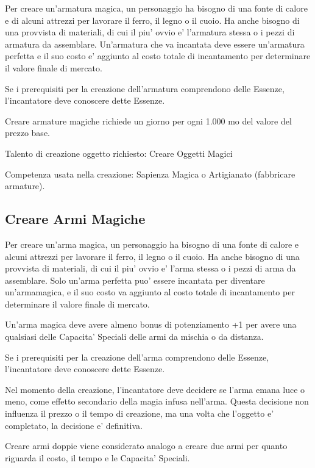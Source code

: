 \documentclass[a4paper,11pt,twoside,openany]{book}
\begin{document}
{		Per creare un'armatura magica, un personaggio ha bisogno di una fonte di calore e di alcuni attrezzi per lavorare il ferro, il legno o il cuoio. Ha anche bisogno di una provvista di materiali, di cui il piu' ovvio e' l'armatura stessa o i pezzi di armatura da assemblare. Un'armatura che va incantata deve essere un'armatura perfetta e il suo costo e' aggiunto al costo totale di incantamento per determinare il valore finale di mercato.
		
		Se i prerequisiti per la creazione dell'armatura comprendono delle Essenze, l'incantatore deve conoscere dette Essenze. 
		
		Creare armature magiche richiede un giorno per ogni 1.000 mo del valore
		del prezzo base.
		
		Talento di creazione oggetto richiesto: Creare Oggetti Magici
		
		Competenza usata nella creazione: Sapienza Magica o Artigianato (fabbricare armature).
		
		\subsection{Creare Armi Magiche}
		
		Per creare un'arma magica, un personaggio ha bisogno di una fonte di calore e alcuni attrezzi per lavorare il ferro, il legno o il cuoio. Ha anche bisogno di una provvista di materiali, di cui il piu' ovvio e' l'arma stessa o i pezzi di arma da assemblare. Solo un'arma perfetta puo' essere incantata per diventare un'armamagica, e il suo costo va aggiunto al costo totale di incantamento per determinare il valore finale di mercato.
		
		Un'arma magica deve avere almeno bonus di potenziamento +1 per avere una qualsiasi delle Capacita' Speciali delle armi da mischia o da distanza.
		
		Se i prerequisiti per la creazione dell'arma comprendono delle Essenze, l'incantatore deve conoscere dette Essenze.
		
		Nel momento della creazione, l'incantatore deve decidere se l'arma emana luce o meno, come effetto secondario della magia infusa nell'arma. Questa decisione non influenza il prezzo o il tempo di creazione, ma una volta che l'oggetto e' completato, la decisione e' definitiva.
		
		Creare armi doppie viene considerato analogo a creare due armi per quanto riguarda il costo, il tempo e le Capacita' Speciali.
		
}
\end{document}
